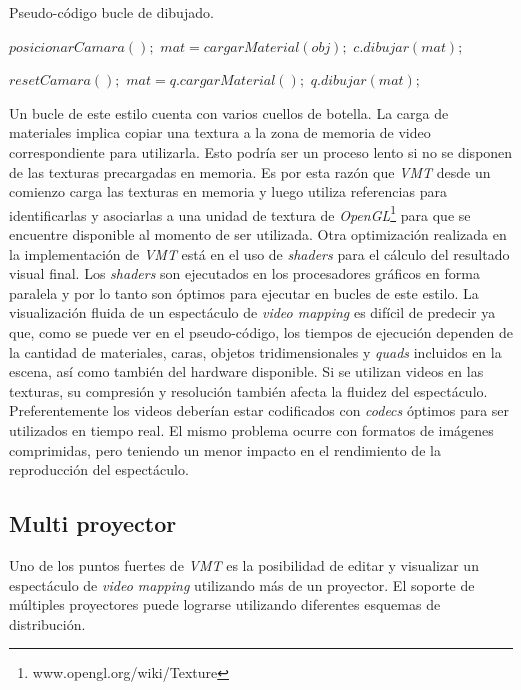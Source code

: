 \begin{algorithm}
    \caption{Pseudo-código bucle de dibujado.}
    \label{alg:mainLoop}
    \begin{algorithmic}
      \State $posicionarCamara();$
             \State $mat = cargarMaterial(obj);$
             \State $c.dibujar(mat);$
         \EndFor
      \EndFor

      \State $resetCamara();$
         \State $mat = q.cargarMaterial();$
         \State $q.dibujar(mat);$
      \EndFor
    \end{algorithmic}
\end{algorithm}

Un bucle de este estilo cuenta con varios cuellos de botella.
La carga de materiales implica copiar una textura a la zona de memoria de video correspondiente para utilizarla. Esto podría ser un proceso lento si no se disponen de las texturas precargadas en memoria. Es por esta razón que \emph{VMT} desde un comienzo carga las texturas en memoria y luego utiliza referencias para identificarlas y asociarlas a una unidad de textura de \emph{OpenGL}\footnote{www.opengl.org/wiki/Texture} para que se encuentre disponible al momento de ser utilizada.
Otra optimización realizada en la implementación de \emph{VMT} está en el uso de \emph{shaders} para el cálculo del resultado visual final. Los \emph{shaders} son ejecutados en los procesadores gráficos en forma paralela y por lo tanto son óptimos para ejecutar en bucles de este estilo.
La visualización fluida de un espectáculo de \emph{video mapping} es difícil de predecir ya que, como se puede ver en el pseudo-código, los tiempos de ejecución dependen de la cantidad de materiales, caras, objetos tridimensionales y \emph{quads} incluidos en la escena, así como también del hardware disponible.
Si se utilizan videos en las texturas, su compresión y resolución también afecta la fluidez del espectáculo. Preferentemente los videos deberían estar codificados con \emph{codecs} óptimos para ser utilizados en tiempo real. El mismo problema ocurre con formatos de imágenes comprimidas, pero teniendo un menor impacto en el rendimiento de la reproducción del espectáculo.

\subsection{Multi proyector}

Uno de los puntos fuertes de \emph{VMT} es la posibilidad de editar y visualizar un espectáculo de \emph{video mapping} utilizando más de un proyector. El soporte de múltiples proyectores puede lograrse utilizando diferentes esquemas de distribución.

